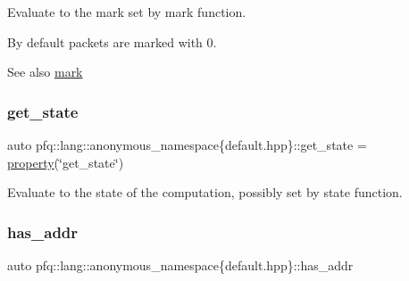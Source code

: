Evaluate to the mark set by {\ttfamily mark} function. 

By default packets are marked with 0.

\begin{DoxySeeAlso}{See also}
\hyperlink{namespacepfq_1_1lang_1_1anonymous__namespace_02default_8hpp_03_a7b831baeabda070b89ca862a9445a4a8}{mark} 
\end{DoxySeeAlso}
\mbox{\label{namespacepfq_1_1lang_1_1anonymous__namespace_02default_8hpp_03_acd2598e95a0ebc3c21e84f9c861d0d98}} 
\subsubsection{\texorpdfstring{get\+\_\+state}{get\_state}}
{\footnotesize\ttfamily auto pfq\+::lang\+::anonymous\+\_\+namespace\{default.\+hpp\}\+::get\+\_\+state = \hyperlink{namespacepfq_1_1lang_a1249450e72229273b0db707a286aea91}{property}(\char`\"{}get\+\_\+state\char`\"{})}



Evaluate to the state of the computation, possibly set by {\ttfamily state} function. 

\mbox{\label{namespacepfq_1_1lang_1_1anonymous__namespace_02default_8hpp_03_a74c6b7e812fb3d312ebf534960a6a91d}} 
\subsubsection{\texorpdfstring{has\+\_\+addr}{has\_addr}}
{\footnotesize\ttfamily auto pfq\+::lang\+::anonymous\+\_\+namespace\{default.\+hpp\}\+::has\+\_\+addr}


